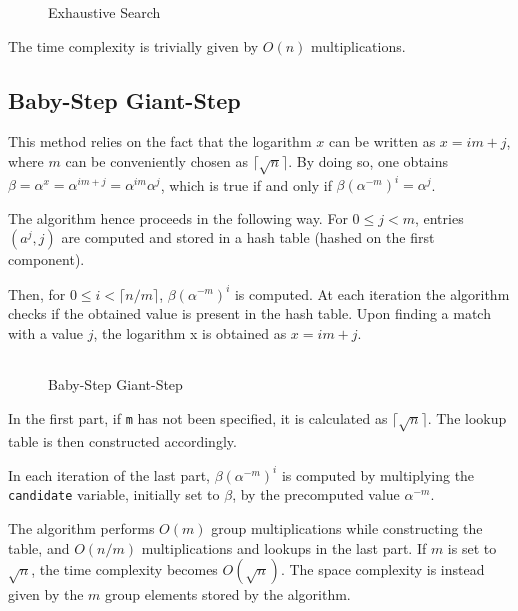 \documentclass[UTF8]{article}
\begin{document}
\begin{figure}[H]
    \centering
    \caption{Exhaustive Search}
    \begin{tabular}{c}
        
    \end{tabular}
\end{figure}

The time complexity is trivially given by $O(n)$ multiplications.

\subsection{Baby-Step Giant-Step}

This method relies on the fact that the logarithm $x$ can be written as $x = i m + j$, where $m$ can be conveniently chosen as $\lceil \sqrt{n} \rceil$. By doing so, one obtains $\beta = \alpha^{x} = \alpha^{i m + j} = \alpha^{i m} \alpha^{j}$, which is true if and only if $\beta (\alpha^{-m})^i = \alpha^{j}$.

The algorithm hence proceeds in the following way. For $0 \leq j < m$, entries $(a^j, j)$ are computed and stored in a hash table (hashed on the first component).

Then, for $0 \leq i < \lceil n / m \rceil$, $\beta (\alpha^{-m})^i$ is computed. At each iteration the algorithm checks if the obtained value is present in the hash table. Upon finding a match with a value $j$, the logarithm x is obtained as $x = i m + j$.

\begin{figure}[H]
    \centering
    \caption{Baby-Step Giant-Step}
    \begin{tabular}{c}
        
    \end{tabular}
\end{figure}

In the first part, if \verb|m| has not been specified, it is calculated as $\lceil \sqrt{n} \rceil$. The lookup table is then constructed accordingly.

In each iteration of the last part, $\beta (\alpha^{-m})^i$ is computed by multiplying the \verb|candidate| variable, initially set to $\beta$, by the precomputed value $\alpha^{-m}$.

The algorithm performs $O(m)$ group multiplications while constructing the table, and $O(n/m)$ multiplications and lookups in the last part. If $m$ is set to $\sqrt{n}$, the time complexity becomes $O(\sqrt{n})$. The space complexity is instead given by the $m$ group elements stored by the algorithm.
\end{document}
